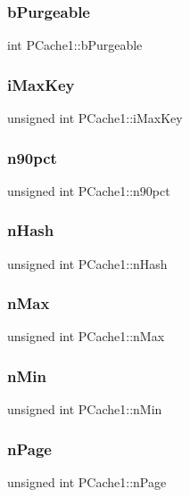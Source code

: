 \subsubsection{bPurgeable}
{\footnotesize\ttfamily int P\+Cache1\+::b\+Purgeable}

\mbox{\label{struct_p_cache1_a2dff616ad2d1873ad3a8d20d53bcb4d0}} 
\subsubsection{iMaxKey}
{\footnotesize\ttfamily unsigned int P\+Cache1\+::i\+Max\+Key}

\mbox{\label{struct_p_cache1_a8a5c5ab7d71e66c2a4df3f22513888f0}} 
\subsubsection{n90pct}
{\footnotesize\ttfamily unsigned int P\+Cache1\+::n90pct}

\mbox{\label{struct_p_cache1_a09d9488a8a3a52822e33dd43e14c69e1}} 
\subsubsection{nHash}
{\footnotesize\ttfamily unsigned int P\+Cache1\+::n\+Hash}

\mbox{\label{struct_p_cache1_aef08139a0b86b0c0a7ee2bec0bab2405}} 
\subsubsection{nMax}
{\footnotesize\ttfamily unsigned int P\+Cache1\+::n\+Max}

\mbox{\label{struct_p_cache1_a9e96c79ec60c2e368f92a2ba52d01c44}} 
\subsubsection{nMin}
{\footnotesize\ttfamily unsigned int P\+Cache1\+::n\+Min}

\mbox{\label{struct_p_cache1_ace332c276e28352992529f60f0ac457c}} 
\subsubsection{nPage}
{\footnotesize\ttfamily unsigned int P\+Cache1\+::n\+Page}

